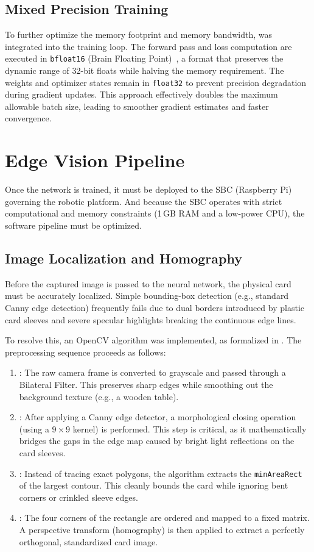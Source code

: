 \subsection{Mixed Precision Training}
To further optimize the memory footprint and memory bandwidth,  was integrated into the training loop. The forward pass and loss computation are executed in \texttt{bfloat16} (Brain Floating Point)~\cite{kalamkar2019bfloat}, a format that preserves the dynamic range of 32-bit floats while halving the memory requirement. The weights and optimizer states remain in \texttt{float32} to prevent precision degradation during gradient updates. This approach effectively doubles the maximum allowable batch size, leading to smoother gradient estimates and faster convergence.

\section{Edge Vision Pipeline}
Once the network is trained, it must be deployed to the \ac{SBC} (Raspberry Pi) governing the robotic platform. And because the \ac{SBC} operates with strict computational and memory constraints (1\,GB RAM and a low-power CPU), the software pipeline must be optimized.

\subsection{Image Localization and Homography}
Before the captured image is passed to the neural network, the physical card must be accurately localized. Simple bounding-box detection (e.g., standard Canny edge detection) frequently fails due to dual borders introduced by plastic card sleeves and severe specular highlights breaking the continuous edge lines.

To resolve this, an OpenCV algorithm was implemented, as formalized in . The preprocessing sequence proceeds as follows:
\begin{enumerate}
    \item {}: The raw camera frame is converted to grayscale and passed through a Bilateral Filter. This preserves sharp edges while smoothing out the background texture (e.g., a wooden table).
    \item {}: After applying a Canny edge detector, a morphological closing operation (using a $9 \times 9$ kernel) is performed. This step is critical, as it mathematically bridges the gaps in the edge map caused by bright light reflections on the card sleeves.
    \item {}: Instead of tracing exact polygons, the algorithm extracts the \texttt{minAreaRect} of the largest contour. This cleanly bounds the card while ignoring bent corners or crinkled sleeve edges.
    \item {}: The four corners of the rectangle are ordered and mapped to a fixed matrix. A perspective transform (homography) is then applied to extract a perfectly orthogonal, standardized card image.
\end{enumerate}

